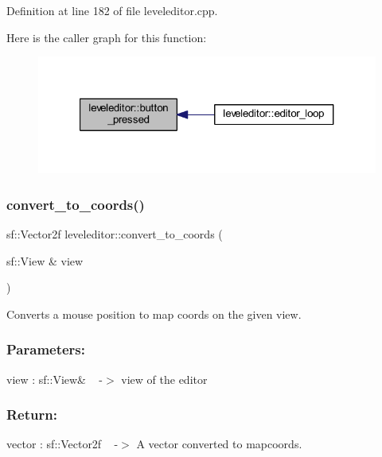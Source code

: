 Definition at line 182 of file leveleditor.\+cpp.

Here is the caller graph for this function\+:
\nopagebreak
\begin{figure}[H]
\begin{center}
\leavevmode
\includegraphics[width=321pt]{classleveleditor_aefcb8b0819a53d39936400d5c4f4952e_icgraph}
\end{center}
\end{figure}
\mbox{\label{classleveleditor_ac2de1ac26fa5f7e10ca834e6448b1b6b}} 
\subsubsection{\texorpdfstring{convert\+\_\+to\+\_\+coords()}{convert\_to\_coords()}}
{\footnotesize\ttfamily sf\+::\+Vector2f leveleditor\+::convert\+\_\+to\+\_\+coords (\begin{DoxyParamCaption}\item[{sf\+::\+View \&}]{view }\end{DoxyParamCaption})\hspace{0.3cm}{\ttfamily [private]}}



Converts a mouse position to map coords on the given view. 

\subsubsection*{Parameters\+: }

view \+: sf\+::\+View\& ~\newline
-\/$>$ view of the editor

\subsubsection*{Return\+: }

vector \+: sf\+::\+Vector2f ~\newline
-\/$>$ A vector converted to mapcoords.

